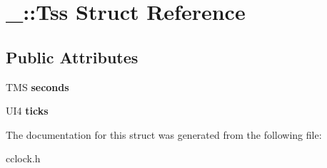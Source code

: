 \hypertarget{struct___1_1_tss}{}\section{\+\_\+\+:\+:Tss Struct Reference}
\label{struct___1_1_tss}
\subsection*{Public Attributes}
\begin{DoxyCompactItemize}
\item 
\mbox{\label{struct___1_1_tss_a35a63a33e02cd25e0d9e1b77b9d5f698}} 
T\+MS {\bfseries seconds}
\item 
\mbox{\label{struct___1_1_tss_a7a6f22ad49f9b9b1ed80ea9928c8abb8}} 
U\+I4 {\bfseries ticks}
\end{DoxyCompactItemize}


The documentation for this struct was generated from the following file\+:\begin{DoxyCompactItemize}
\item 
cclock.\+h\end{DoxyCompactItemize}
